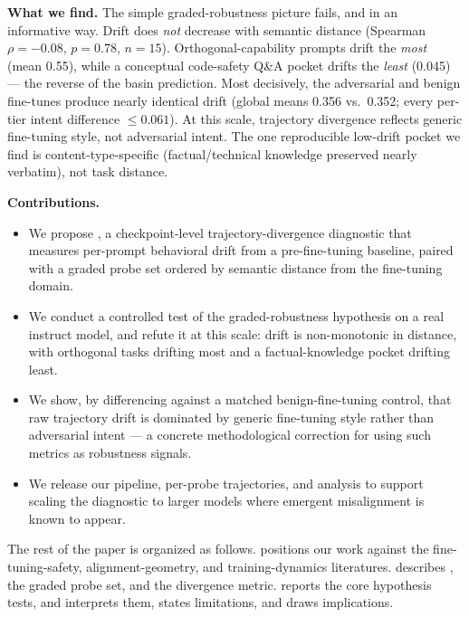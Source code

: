 {\bf What we find.} The simple graded-robustness picture fails, and in an informative way.
Drift does \emph{not} decrease with semantic distance (Spearman $\rho=-0.08$, $p=0.78$,
$n=15$). Orthogonal-capability prompts drift the \emph{most} (mean 0.55), while a conceptual
code-safety Q\&A pocket drifts the \emph{least} (0.045) --- the reverse of the basin
prediction. Most decisively, the adversarial and benign fine-tunes produce nearly identical
drift (global means 0.356 vs.\ 0.352; every per-tier intent difference $\le 0.061$). At this
scale, trajectory divergence reflects generic fine-tuning style, not adversarial intent. The
one reproducible low-drift pocket we find is content-type-specific (factual/technical
knowledge preserved nearly verbatim), not task distance.

{\bf Contributions.}
\begin{itemize}[leftmargin=*,itemsep=0pt,topsep=0pt]
    \item We propose \method, a checkpoint-level trajectory-divergence diagnostic that
    measures per-prompt behavioral drift from a pre-fine-tuning baseline, paired with a
    graded probe set ordered by semantic distance from the fine-tuning domain.
    \item We conduct a controlled test of the graded-robustness hypothesis on a real instruct
    model, and refute it at this scale: drift is non-monotonic in distance, with orthogonal
    tasks drifting most and a factual-knowledge pocket drifting least.
    \item We show, by differencing against a matched benign-fine-tuning control, that raw
    trajectory drift is dominated by generic fine-tuning style rather than adversarial intent
    --- a concrete methodological correction for using such metrics as robustness signals.
    \item We release our pipeline, per-probe trajectories, and analysis to support scaling
    the diagnostic to larger models where emergent misalignment is known to appear.
\end{itemize}

The rest of the paper is organized as follows.  positions our work
against the fine-tuning-safety, alignment-geometry, and training-dynamics literatures.
 describes \method, the graded probe set, and the divergence metric.
 reports the core hypothesis tests, and 
interprets them, states limitations, and draws implications.
